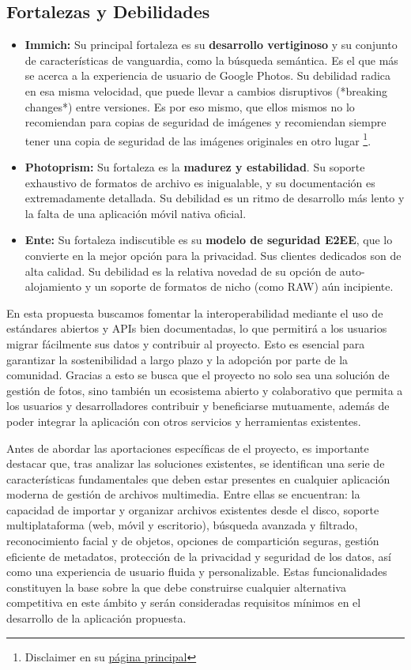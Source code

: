 \subsection{Fortalezas y Debilidades}
\begin{itemize}
    \item \textbf{Immich:} Su principal fortaleza es su \textbf{desarrollo vertiginoso} y su conjunto de características de vanguardia, como la búsqueda semántica. Es el que más se acerca a la experiencia de usuario de Google Photos. Su debilidad radica en esa misma velocidad, que puede llevar a cambios disruptivos (*breaking changes*) entre versiones. Es por eso mismo, que ellos mismos no lo recomiendan para copias de seguridad de imágenes y recomiendan siempre tener una copia de seguridad de las imágenes originales en otro lugar \footnote{Disclaimer en su \href{https://immich.app/}{página principal}}.
    \item \textbf{Photoprism:} Su fortaleza es la \textbf{madurez y estabilidad}. Su soporte exhaustivo de formatos de archivo es inigualable, y su documentación es extremadamente detallada. Su debilidad es un ritmo de desarrollo más lento y la falta de una aplicación móvil nativa oficial.
    \item \textbf{Ente:} Su fortaleza indiscutible es su \textbf{modelo de seguridad E2EE}, que lo convierte en la mejor opción para la privacidad. Sus clientes dedicados son de alta calidad. Su debilidad es la relativa novedad de su opción de auto-alojamiento y un soporte de formatos de nicho (como RAW) aún incipiente.
\end{itemize}


En esta propuesta buscamos fomentar la interoperabilidad mediante el uso de estándares abiertos y APIs bien documentadas, lo que permitirá a los usuarios migrar fácilmente sus datos y contribuir al proyecto. Esto es esencial para garantizar la sostenibilidad a largo plazo y la adopción por parte de la comunidad.
Gracias a esto se busca que el proyecto no solo sea una solución de gestión de fotos, sino también un ecosistema abierto y colaborativo que permita a los usuarios y desarrolladores contribuir y beneficiarse mutuamente, además de poder integrar la aplicación con otros servicios y herramientas existentes.

Antes de abordar las aportaciones específicas de el proyecto, es importante destacar que, tras analizar las soluciones existentes, se identifican una serie de características fundamentales que deben estar presentes en cualquier aplicación moderna de gestión de archivos multimedia. Entre ellas se encuentran: la capacidad de importar y organizar archivos existentes desde el disco, soporte multiplataforma (web, móvil y escritorio), búsqueda avanzada y filtrado, reconocimiento facial y de objetos, opciones de compartición seguras, gestión eficiente de metadatos, protección de la privacidad y seguridad de los datos, así como una experiencia de usuario fluida y personalizable. Estas funcionalidades constituyen la base sobre la que debe construirse cualquier alternativa competitiva en este ámbito y serán consideradas requisitos mínimos en el desarrollo de la aplicación propuesta.

